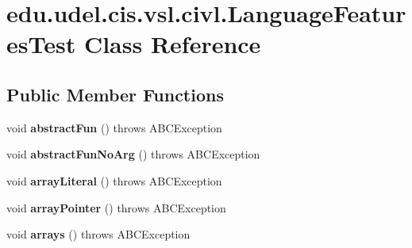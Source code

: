 \hypertarget{classedu_1_1udel_1_1cis_1_1vsl_1_1civl_1_1LanguageFeaturesTest}{}\section{edu.\+udel.\+cis.\+vsl.\+civl.\+Language\+Features\+Test Class Reference}
\label{classedu_1_1udel_1_1cis_1_1vsl_1_1civl_1_1LanguageFeaturesTest}
\subsection*{Public Member Functions}
\begin{DoxyCompactItemize}
\item 
\hypertarget{classedu_1_1udel_1_1cis_1_1vsl_1_1civl_1_1LanguageFeaturesTest_af6cfc3d00bb0616ffd9dd83d6a1a9a65}{}void {\bfseries abstract\+Fun} ()  throws A\+B\+C\+Exception \label{classedu_1_1udel_1_1cis_1_1vsl_1_1civl_1_1LanguageFeaturesTest_af6cfc3d00bb0616ffd9dd83d6a1a9a65}

\item 
\hypertarget{classedu_1_1udel_1_1cis_1_1vsl_1_1civl_1_1LanguageFeaturesTest_accbeceec295eff2c6ff5111c0b2afcf4}{}void {\bfseries abstract\+Fun\+No\+Arg} ()  throws A\+B\+C\+Exception \label{classedu_1_1udel_1_1cis_1_1vsl_1_1civl_1_1LanguageFeaturesTest_accbeceec295eff2c6ff5111c0b2afcf4}

\item 
\hypertarget{classedu_1_1udel_1_1cis_1_1vsl_1_1civl_1_1LanguageFeaturesTest_acbcd6b5047da9ff40699d1147d344601}{}void {\bfseries array\+Literal} ()  throws A\+B\+C\+Exception \label{classedu_1_1udel_1_1cis_1_1vsl_1_1civl_1_1LanguageFeaturesTest_acbcd6b5047da9ff40699d1147d344601}

\item 
\hypertarget{classedu_1_1udel_1_1cis_1_1vsl_1_1civl_1_1LanguageFeaturesTest_a22bde4783e0e834ea587892fbfb31db8}{}void {\bfseries array\+Pointer} ()  throws A\+B\+C\+Exception \label{classedu_1_1udel_1_1cis_1_1vsl_1_1civl_1_1LanguageFeaturesTest_a22bde4783e0e834ea587892fbfb31db8}

\item 
\hypertarget{classedu_1_1udel_1_1cis_1_1vsl_1_1civl_1_1LanguageFeaturesTest_a764dbcc18acf3d6bd9225b6b0c1164bd}{}void {\bfseries arrays} ()  throws A\+B\+C\+Exception \label{classedu_1_1udel_1_1cis_1_1vsl_1_1civl_1_1LanguageFeaturesTest_a764dbcc18acf3d6bd9225b6b0c1164bd}


\end{DoxyCompactItemize}
